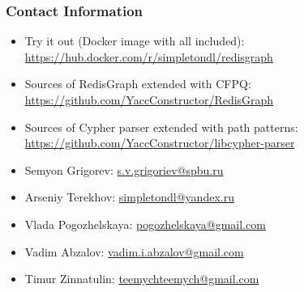 \documentclass[xcolor=table,aspectratio=169]{beamer}
\begin{document}
\begin{frame}
\frametitle{Contact Information}
\begin{minipage}[t]{0.8\textwidth}
\begin{itemize}
  \item Try it out (Docker image with all included): \url{https://hub.docker.com/r/simpletondl/redisgraph}
  \item Sources of RedisGraph extended with CFPQ: \url{https://github.com/YaccConstructor/RedisGraph}
  \item Sources of Cypher parser extended with path patterns: \url{https://github.com/YaccConstructor/libcypher-parser}

  \vspace{0.5cm}  
  \pause
  \item Semyon Grigorev: \href{mailto:s.v.grigoriev@spbu.ru}{s.v.grigoriev@spbu.ru}    
  \item Arseniy Terekhov: \href{mailto:simpletondl@yandex.ru}{simpletondl@yandex.ru}
  \item Vlada Pogozhelskaya: \href{mailto:pogozhelskaya@gmail.com}{pogozhelskaya@gmail.com}
  \item Vadim Abzalov: \href{mailto:vadim.i.abzalov@gmail.com}{vadim.i.abzalov@gmail.com}
  \item Timur Zinnatulin: \href{mailto:teemychteemych@gmail.com}{teemychteemych@gmail.com}
\end{itemize}
\end{minipage}~
\begin{minipage}[t]{0.19\textwidth}
\pause
\vspace{2.5cm}
\end{minipage}
\end{frame}
\end{document}
